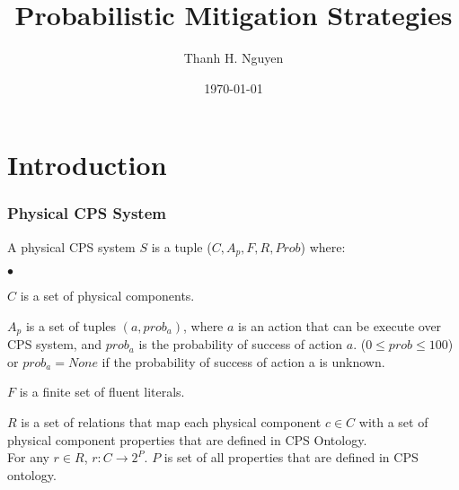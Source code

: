 \documentclass{beamer}
\title[Truthworthiness value]{Probabilistic Mitigation Strategies} %
\author{Thanh H. Nguyen} %
\institute[NMSU] %
{
New Mexico State University \\ %
\medskip
\textit{tnguyen@cs.nmsu.edu} %
}
\date{\today} %
\begin{document}
\begin{frame}
\titlepage %
\end{frame}




\section{Introduction} 

\begin{frame}
	\frametitle{Physical CPS System}
	\begin{definition}
		\label{def:physical_CPS_system} 
		A physical CPS system $S$ is a tuple ($C, A_p, F, R, Prob$) where:
		\begin{list}{$\bullet$}{\itemsep=0pt \parsep=1pt \topsep=1pt \leftmargin=12pt} 
			\item $C$ is a set of physical components.
			\item $A_p$ is a set of tuples $(a, prob_a)$, where $a$ is an action that can be execute over CPS system, and $prob_a$ is the probability of success of action $a$. ($0 \leq prob \leq 100$) or $prob_a = None$ if the probability of success of action a is unknown.
			\item $F$ is a finite set of fluent literals.
			\item $R$ is a set of relations that map each physical component $c \in C$ with a set of physical component properties that are defined in CPS Ontology.  \\
			For any $r \in R$, $r : C \longrightarrow 2^{P}$. $P$ is set of all properties that are defined in CPS ontology. 
		\end{list}
	\end{definition}
\end{frame}
\end{document}
